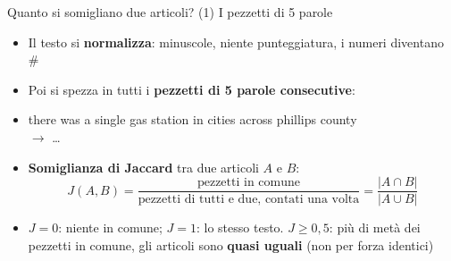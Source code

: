 \documentclass[aspectratio=169]{beamer}
\newcommand{\hl}[1]{\textbf{#1}}
\begin{document}
\begin{frame}{Quanto si somigliano due articoli? (1) I pezzetti di 5 parole}
  \begin{itemize}[<+->]
    \setlength\itemsep{0.6em}
    \item Il testo si \hl{normalizza}: minuscole, niente punteggiatura, i numeri diventano \#
    \item Poi si spezza in tutti i \hl{pezzetti di 5 parole consecutive}:
    \item[] {\small\ttfamily there was a single gas station in cities across phillips county}\\[0.2em]
            {\small $\to$  \dots}
    \item \hl{Somiglianza di Jaccard} tra due articoli $A$ e $B$:
    \[ J(A,B) = \frac{\text{pezzetti in comune}}{\text{pezzetti di tutti e due, contati una volta}} = \frac{|A \cap B|}{|A \cup B|} \]
    \item $J = 0$: niente in comune; $J = 1$: lo stesso testo. \hl{$J \geq 0{,}5$}: pi\`u di met\`a dei pezzetti in comune, gli articoli sono \hl{quasi uguali} (non per forza identici)
  \end{itemize}
\end{frame}
\end{document}
